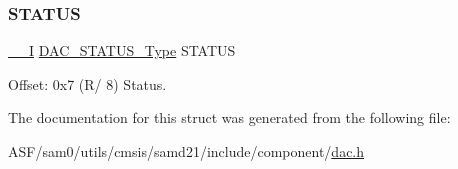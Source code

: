 \mbox{\label{struct_dac_af742ee08f000b4fa73c1513eb9501e23}} 
\subsubsection{\texorpdfstring{STATUS}{STATUS}}
{\footnotesize\ttfamily \mbox{\hyperlink{core__cm0plus_8h_af63697ed9952cc71e1225efe205f6cd3}{\+\_\+\+\_\+I}} \mbox{\hyperlink{union_d_a_c___s_t_a_t_u_s___type}{D\+A\+C\+\_\+\+S\+T\+A\+T\+U\+S\+\_\+\+Type}} S\+T\+A\+T\+US}



Offset\+: 0x7 (R/ 8) Status. 



The documentation for this struct was generated from the following file\+:\begin{DoxyCompactItemize}
\item 
A\+S\+F/sam0/utils/cmsis/samd21/include/component/\mbox{\hyperlink{component_2dac_8h}{dac.\+h}}\end{DoxyCompactItemize}
